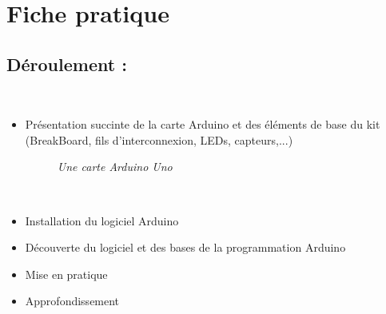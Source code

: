 \chapter*{Fiche pratique}


\section{Déroulement :}\\

\begin{itemize}\\
	\item Présentation succinte de la carte Arduino et des éléments de base du kit (BreakBoard, fils d'interconnexion, LEDs, capteurs,...)\\
\begin{figure}[H]
	\begin{center}
	\end{center}
	\caption{ \textit{Une carte Arduino Uno}}
\end{figure}\\

	\item Installation du logiciel Arduino
	\item Découverte du logiciel et des bases de la programmation Arduino
	\item Mise en pratique
	\item Approfondissement
\end{itemize}\\

